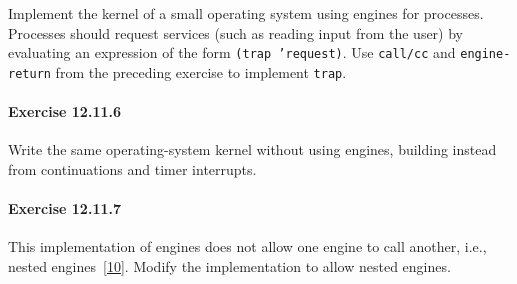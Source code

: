 \label{examples_s105}Implement the kernel of a small \label{examples_s106}operating
system using engines for processes.
Processes should request services (such as reading input from the user)
by evaluating an expression of the form \texttt{(trap 'request)}.
Use \texttt{call/cc} and \texttt{engine-return} from the preceding
exercise to implement \texttt{trap}.


\paragraph{Exercise \label{examples_g217}12.11.6}


\label{examples_s107}Write the same operating-system kernel without using engines, building
instead from continuations and timer interrupts.


\paragraph{Exercise \label{examples_g218}12.11.7}


\label{examples_s108}This implementation of engines does not allow one engine to call
another, i.e., nested engines [\hyperref[bibliography_g228]{10}].
Modify the implementation to allow \label{examples_s109}nested
engines.



